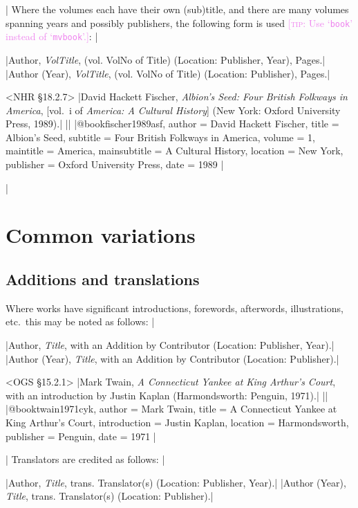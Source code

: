 \documentclass[extrafontsizes,11pt,a4paper,oneside]{memoir}
\newcommand*{\lit}[1]{\textsf{#1}}
\newcommand*{\code}[1]{`\texttt{#1}'}
\newcommand*{\aside}[1]{\textcolor{violet}{[\textsc{tip:} #1]}}
\begin{document}
\todoc|
Where the volumes each have their own (sub)title,
and there are many volumes spanning years and possibly publishers,
the following form is used \aside{Use \code{book} instead of \code{mvbook}.}:
|

\specs
|Author, \emph{VolTitle}, (\lit{vol.} VolNo \lit{of} Title) (Location: Publisher, Year), Pages.|%
|Author (Year), \emph{VolTitle}, (\lit{vol.} VolNo \lit{of} Title) (Location: Publisher), Pages.|

\bibexample<NHR \S18.2.7>
|David Hackett Fischer, \emph{Albion’s Seed: Four British Folkways in America}, [vol.\ i of \emph{America: A Cultural History}] (New York: Oxford University Press, 1989).|%
||%
|@book{fischer1989asf,
  author = {David Hackett Fischer},
  title = {Albion’s Seed},
  subtitle = {Four British Folkways in America},
  volume = {1},
  maintitle = {America},
  mainsubtitle = {A Cultural History},
  location = {New York},
  publisher = {Oxford University Press},
  date = {1989}
}|

\todoc|
\section{Common variations}

\subsection{Additions and translations}

Where works have significant introductions, forewords, afterwords, illustrations, etc.\ this may be noted as follows:
|

\specs
|Author, \emph{Title}, \lit{with an} Addition \lit{by} Contributor (Location: Publisher, Year).|%
|Author (Year), \emph{Title}, \lit{with an} Addition \lit{by} Contributor (Location: Publisher).|

\bibexample<OGS \S15.2.1>
|Mark Twain, \emph{A Connecticut Yankee at King Arthur's Court}, with an introduction by Justin Kaplan (Harmondsworth: Penguin, 1971).|%
||%
|@book{twain1971cyk,
  author = {Mark Twain},
  title = {A {Connecticut} Yankee at {King} {Arthur's} Court},
  introduction = {Justin Kaplan},
  location = {Harmondsworth},
  publisher = {Penguin},
  date = {1971}
}|

\todoc|
Translators are credited as follows:
|

\specs
|Author, \emph{Title}, \lit{trans.} Translator(s) (Location: Publisher, Year).|%
|Author (Year), \emph{Title}, \lit{trans.} Translator(s) (Location: Publisher).|
\end{document}
